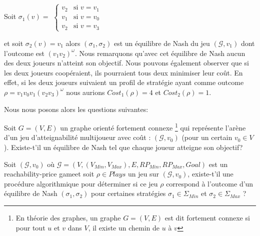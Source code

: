 Soit $\sigma _{1}(v) =$ $\begin{cases}
						v_{2} & \text{si } v = v_{1} \\
						v_{1 } & \text{si } v = v_{0} \\
						v_{2} & \text{si } v = v_{3} 
						\end{cases}$
						
						
						
\noindent et soit $\sigma _{2}(v) = v_{1}$ alors $(\sigma _{1},\sigma _{2})$ est un équilibre de Nash du jeu $(\mathcal{G},v_{1})$ dont l'outcome est $(v_{1}v_{2})^{\omega}$. Nous remarquons qu'avec cet équilibre de Nash aucun des deux joueurs n'atteint son objectif. Nous pouvons également observer que si les deux joueurs coopéraient, ils pourraient tous deux minimiser leur coût. En effet, si les deux joueurs suivaient un profil de stratégie ayant comme outcome $\rho = v_{1}v_{0}v_{1}(v_{2}v_{3})^{\omega} $ nous aurions $Cost_{1}(\rho) = 4$ et $Cost_{2}(\rho) = 1$.

Nous nous posons alors les questions suivantes:

\begin{qst}
	
	Soit $G = (V,E)$ un graphe orienté fortement connexe \footnote{En théorie des graphes, un graphe $G = (V,E)$ est dit fortement connexe si pour tout $u$ et $v$ dans $V$, il existe un chemin de $u$ à $v$} qui représente l'arène d'un jeu d'atteignabilité multijoueur avec coût : $(\mathcal{G},v_{0})$ (pour un certain $v_{0} \in V$).
Existe-t'il un équilibre de Nash tel que chaque joueur atteigne son objectif?

\end{qst}
	

\begin{qst}
	Soit $(\mathcal{G},v_{0})$ où $\mathcal{G} = (V,(V_{Min},V_{Max}),E,RP_{Min},RP_{Max},Goal)$ est un \og reachability-price game\fg  et soit $\rho \in Plays$ un jeu sur $(\mathcal{G},v_{0})$, existe-t'il une procédure algorithmique pour déterminer si ce jeu $\rho$ correspond à l'outcome d'un équilibre de Nash $(\sigma _{1},\sigma _{2})$ pour certaines stratégies $\sigma _{1}\in \Sigma _{Min}$ et $\sigma _{2}\in \Sigma _{Max}$ ?
	
\end{qst}

